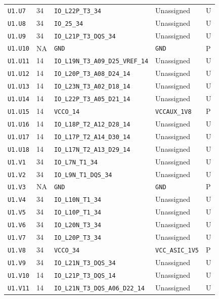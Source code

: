 \documentclass[11pt,a4paper]{article}
\begin{document}
\begin{longtable}{@{}P{20mm}P{10mm}P{70mm}P{51mm}P{11mm}@{}}
\nolinkurl{U1.U7} & 34 & \nolinkurl{IO_L22P_T3_34} & Unassigned & U \\
\nolinkurl{U1.U8} & 34 & \nolinkurl{IO_25_34} & Unassigned & U \\
\nolinkurl{U1.U9} & 34 & \nolinkurl{IO_L21P_T3_DQS_34} & Unassigned & U \\
\nolinkurl{U1.U10} & NA & \nolinkurl{GND} & \nolinkurl{GND} & P \\
\nolinkurl{U1.U11} & 14 & \nolinkurl{IO_L19N_T3_A09_D25_VREF_14} & Unassigned & U \\
\nolinkurl{U1.U12} & 14 & \nolinkurl{IO_L20P_T3_A08_D24_14} & Unassigned & U \\
\nolinkurl{U1.U13} & 14 & \nolinkurl{IO_L23N_T3_A02_D18_14} & Unassigned & U \\
\nolinkurl{U1.U14} & 14 & \nolinkurl{IO_L22P_T3_A05_D21_14} & Unassigned & U \\
\nolinkurl{U1.U15} & 14 & \nolinkurl{VCCO_14} & \nolinkurl{VCCAUX_1V8} & P \\
\nolinkurl{U1.U16} & 14 & \nolinkurl{IO_L18P_T2_A12_D28_14} & Unassigned & U \\
\nolinkurl{U1.U17} & 14 & \nolinkurl{IO_L17P_T2_A14_D30_14} & Unassigned & U \\
\nolinkurl{U1.U18} & 14 & \nolinkurl{IO_L17N_T2_A13_D29_14} & Unassigned & U \\
\nolinkurl{U1.V1} & 34 & \nolinkurl{IO_L7N_T1_34} & Unassigned & U \\
\nolinkurl{U1.V2} & 34 & \nolinkurl{IO_L9N_T1_DQS_34} & Unassigned & U \\
\nolinkurl{U1.V3} & NA & \nolinkurl{GND} & \nolinkurl{GND} & P \\
\nolinkurl{U1.V4} & 34 & \nolinkurl{IO_L10N_T1_34} & Unassigned & U \\
\nolinkurl{U1.V5} & 34 & \nolinkurl{IO_L10P_T1_34} & Unassigned & U \\
\nolinkurl{U1.V6} & 34 & \nolinkurl{IO_L20N_T3_34} & Unassigned & U \\
\nolinkurl{U1.V7} & 34 & \nolinkurl{IO_L20P_T3_34} & Unassigned & U \\
\nolinkurl{U1.V8} & 34 & \nolinkurl{VCCO_34} & \nolinkurl{VCC_ASIC_1V5} & P \\
\nolinkurl{U1.V9} & 34 & \nolinkurl{IO_L21N_T3_DQS_34} & Unassigned & U \\
\nolinkurl{U1.V10} & 14 & \nolinkurl{IO_L21P_T3_DQS_14} & Unassigned & U \\
\nolinkurl{U1.V11} & 14 & \nolinkurl{IO_L21N_T3_DQS_A06_D22_14} & Unassigned & U \\

\end{longtable}
\end{document}
